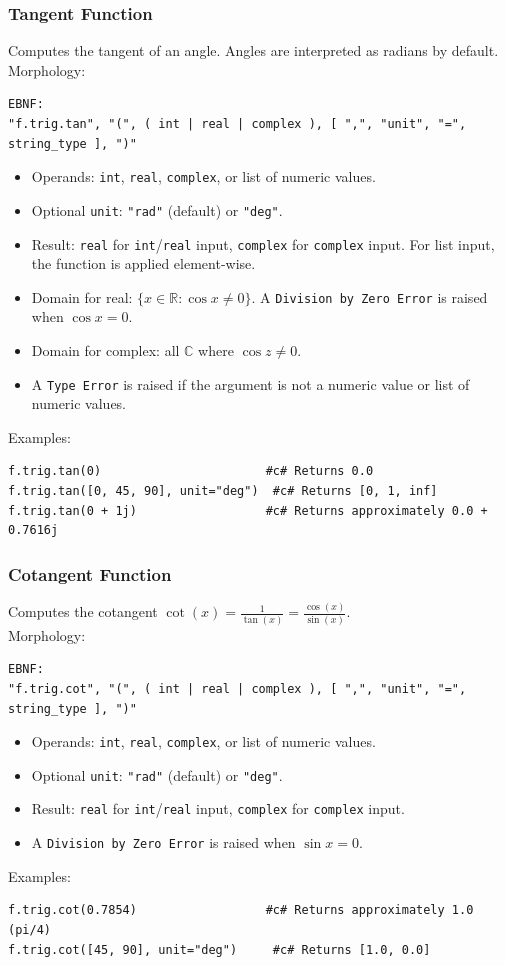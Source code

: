 \subsubsection{Tangent Function}
Computes the tangent of an angle. Angles are interpreted as radians by default. \\
Morphology:
\begin{verbatim}
EBNF:
"f.trig.tan", "(", ( int | real | complex ), [ ",", "unit", "=", string_type ], ")"
\end{verbatim}
\begin{itemize}
\item Operands: \texttt{int}, \texttt{real}, \texttt{complex}, or list of numeric values.
\item Optional \texttt{unit}: \texttt{"rad"} (default) or \texttt{"deg"}.
\item Result: \texttt{real} for \texttt{int}/\texttt{real} input, \texttt{complex} for \texttt{complex} input. For list input, the function is applied element-wise.
\item Domain for real: $\{x \in \mathbb{R} : \cos x \neq 0\}$. A \texttt{Division by Zero Error} is raised when $\cos x = 0$.
\item Domain for complex: all $\mathbb{C}$ where $\cos z \neq 0$.
\item A \texttt{Type Error} is raised if the argument is not a numeric value or list of numeric values.
\end{itemize}
Examples:
\begin{verbatim}
f.trig.tan(0)                       #c# Returns 0.0
f.trig.tan([0, 45, 90], unit="deg")  #c# Returns [0, 1, inf]
f.trig.tan(0 + 1j)                  #c# Returns approximately 0.0 + 0.7616j
\end{verbatim}

\subsubsection{Cotangent Function}
Computes the cotangent $\cot(x) = \frac{1}{\tan(x)} = \frac{\cos(x)}{\sin(x)}$. \\
Morphology:
\begin{verbatim}
EBNF:
"f.trig.cot", "(", ( int | real | complex ), [ ",", "unit", "=", string_type ], ")"
\end{verbatim}
\begin{itemize}
\item Operands: \texttt{int}, \texttt{real}, \texttt{complex}, or list of numeric values.
\item Optional \texttt{unit}: \texttt{"rad"} (default) or \texttt{"deg"}.
\item Result: \texttt{real} for \texttt{int}/\texttt{real} input, \texttt{complex} for \texttt{complex} input.
\item A \texttt{Division by Zero Error} is raised when $\sin x = 0$.
\end{itemize}
Examples:
\begin{verbatim}
f.trig.cot(0.7854)                  #c# Returns approximately 1.0  (pi/4)
f.trig.cot([45, 90], unit="deg")     #c# Returns [1.0, 0.0]
\end{verbatim}

